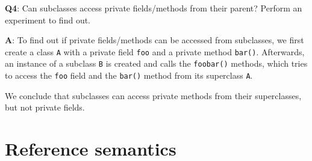 \documentclass[
]{krantz}
\makeatletter
\newenvironment{Shaded}{\begin{snugshade}}{\end{snugshade}}
\newcommand{\CharTok}[1]{\textcolor[rgb]{0.31,0.60,0.02}{#1}}
\newcommand{\CommentTok}[1]{\textcolor[rgb]{0.56,0.35,0.01}{\textit{#1}}}
\newcommand{\ControlFlowTok}[1]{\textcolor[rgb]{0.13,0.29,0.53}{\textbf{#1}}}
\newcommand{\DataTypeTok}[1]{\textcolor[rgb]{0.13,0.29,0.53}{#1}}
\newcommand{\KeywordTok}[1]{\textcolor[rgb]{0.13,0.29,0.53}{\textbf{#1}}}
\newcommand{\NormalTok}[1]{#1}
\newcommand{\OperatorTok}[1]{\textcolor[rgb]{0.81,0.36,0.00}{\textbf{#1}}}
\newcommand{\StringTok}[1]{\textcolor[rgb]{0.31,0.60,0.02}{#1}}
\newenvironment{kframe}{%
\medskip{}
\setlength{\fboxsep}{.8em}
 \def\at@end@of@kframe{}%
 \ifinner\ifhmode%
  \def\at@end@of@kframe{\end{minipage}}%
  \begin{minipage}{\columnwidth}%
 \fi\fi%
 \def\FrameCommand##1{\hskip\@totalleftmargin \hskip-\fboxsep
 \colorbox{shadecolor}{##1}\hskip-\fboxsep
     \hskip-\linewidth \hskip-\@totalleftmargin \hskip\columnwidth}%
 \MakeFramed {\advance\hsize-\width
   \@totalleftmargin\z@ \linewidth\hsize
   \@setminipage}}%
 {\par\unskip\endMakeFramed%
 \at@end@of@kframe}
\renewenvironment{Shaded}{\begin{kframe}}{\end{kframe}}
\renewcommand{\KeywordTok} [1]{\textcolor[rgb]{0.00,0.44,0.13}{{#1}}}
\renewcommand{\DataTypeTok}[1]{\textcolor[rgb]{0.56,0.13,0.00}{{#1}}}
\renewcommand{\CharTok}    [1]{\textcolor[rgb]{0.25,0.44,0.63}{{#1}}}
\renewcommand{\StringTok}  [1]{\textcolor[rgb]{0.25,0.44,0.63}{{#1}}}
\renewcommand{\CommentTok} [1]{\textcolor[rgb]{0.38,0.63,0.69}{{#1}}}
\renewcommand{\NormalTok}  [1]{{#1}}
\makeatother
\begin{document}
\textbf{{Q4}}: Can subclasses access private fields/methods from their parent? Perform an experiment to find out.

\textbf{{A}}: To find out if private fields/methods can be accessed from subclasses, we first create a class \texttt{A} with a private field \texttt{foo} and a private method \texttt{bar()}. Afterwards, an instance of a subclass \texttt{B} is created and calls the \texttt{foobar()} methods, which tries to access the \texttt{foo} field and the \texttt{bar()} method from its superclass \texttt{A}.

\begin{Shaded}
\end{Shaded}

We conclude that subclasses can access private methods from their superclasses, but not private fields.

\hypertarget{reference-semantics}{%
\section{Reference semantics}\label{reference-semantics}}
\end{document}
